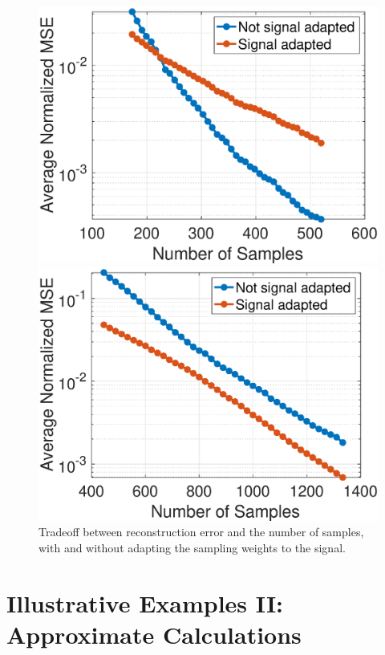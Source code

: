 \documentclass[journal, 10pt]{IEEEtran}
\begin{document}
\begin{figure}[H]
\begin{minipage}[m]{0.4\linewidth}
\centerline{\includegraphics[width=.85\linewidth]{fig_rec_low_nmse2}}
\end{minipage}
\begin{minipage}[m]{0.4\linewidth}
\centerline{\includegraphics[width=.85\linewidth]{fig_rec_band_nmse2}}
\end{minipage}
\caption{Tradeoff between reconstruction error and the number of samples, with and without adapting the sampling weights to the signal.}\label{Fig:samp_tradeoff}
\end{figure}



\section{Illustrative Examples II: Approximate Calculations} \label{Se:ill2}
\end{document}
